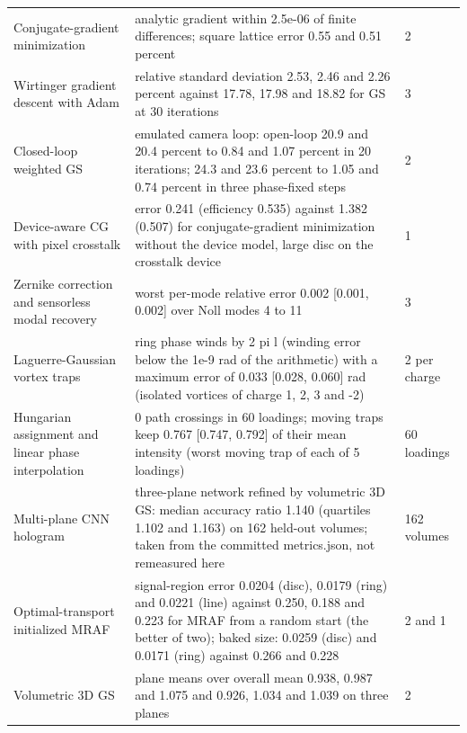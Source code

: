 \begin{longtable}{@{}>{\raggedright\arraybackslash}p{} p{} p{}@{}}
\footnotesize Conjugate-gradient minimization & \footnotesize analytic gradient within 2.5e-06 of finite differences; square lattice error 0.55 and 0.51 percent & \footnotesize 2\\
\footnotesize Wirtinger gradient descent with Adam & \footnotesize relative standard deviation 2.53, 2.46 and 2.26 percent against 17.78, 17.98 and 18.82 for GS at 30 iterations & \footnotesize 3\\
\footnotesize Closed-loop weighted GS & \footnotesize emulated camera loop: open-loop 20.9 and 20.4 percent to 0.84 and 1.07 percent in 20 iterations; 24.3 and 23.6 percent to 1.05 and 0.74 percent in three phase-fixed steps & \footnotesize 2\\
\footnotesize Device-aware CG with pixel crosstalk & \footnotesize error 0.241 (efficiency 0.535) against 1.382 (0.507) for conjugate-gradient minimization without the device model, large disc on the crosstalk device & \footnotesize 1\\
\footnotesize Zernike correction and sensorless modal recovery & \footnotesize worst per-mode relative error 0.002 [0.001, 0.002] over Noll modes 4 to 11 & \footnotesize 3\\
\footnotesize Laguerre-Gaussian vortex traps & \footnotesize ring phase winds by 2 pi l (winding error below the 1e-9 rad of the arithmetic) with a maximum error of 0.033 [0.028, 0.060] rad (isolated vortices of charge 1, 2, 3 and -2) & \footnotesize 2 per charge\\
\footnotesize Hungarian assignment and linear phase interpolation & \footnotesize 0 path crossings in 60 loadings; moving traps keep 0.767 [0.747, 0.792] of their mean intensity (worst moving trap of each of 5 loadings) & \footnotesize 60 loadings\\
\footnotesize Multi-plane CNN hologram & \footnotesize three-plane network refined by volumetric 3D GS: median accuracy ratio 1.140 (quartiles 1.102 and 1.163) on 162 held-out volumes; taken from the committed metrics.json, not remeasured here & \footnotesize 162 volumes\\
\footnotesize Optimal-transport initialized MRAF & \footnotesize signal-region error 0.0204 (disc), 0.0179 (ring) and 0.0221 (line) against 0.250, 0.188 and 0.223 for MRAF from a random start (the better of two); baked size: 0.0259 (disc) and 0.0171 (ring) against 0.266 and 0.228 & \footnotesize 2 and 1\\
\footnotesize Volumetric 3D GS & \footnotesize plane means over overall mean 0.938, 0.987 and 1.075 and 0.926, 1.034 and 1.039 on three planes & \footnotesize 2\\

\end{longtable}
